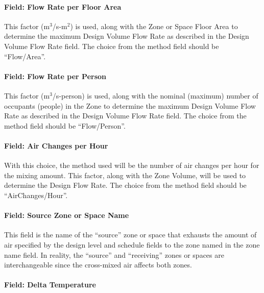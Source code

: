 \paragraph{Field: Flow Rate per Floor Area}\label{field-flow-rate-per-zone-floor-area-2}

This factor (m\(^{3}\)/s-m\(^{2}\)) is used, along with the Zone or Space Floor Area to determine the maximum Design Volume Flow Rate as described in the Design Volume Flow Rate field. The choice from the method field should be ``Flow/Area''.

\paragraph{Field: Flow Rate per Person}\label{field-flow-rate-per-person-2}

This factor (m\(^{3}\)/s-person) is used, along with the nominal (maximum) number of occupants (people) in the Zone to determine the maximum Design Volume Flow Rate as described in the Design Volume Flow Rate field. The choice from the method field should be ``Flow/Person''.

\paragraph{Field: Air Changes per Hour}\label{field-air-changes-per-hour-3}

With this choice, the method used will be the number of air changes per hour for the mixing amount. This factor, along with the Zone Volume, will be used to determine the Design Flow Rate. The choice from the method field should be ``AirChanges/Hour''.

\paragraph{Field: Source Zone or Space Name}\label{field-source-zone-name-1}

This field is the name of the ``source'' zone or space that exhausts the amount of air specified by the design level and schedule fields to the zone named in the zone name field. In reality, the ``source'' and ``receiving'' zones or spaces are interchangeable since the cross-mixed air affects both zones.

\paragraph{Field: Delta Temperature}\label{field-delta-temperature-3}


